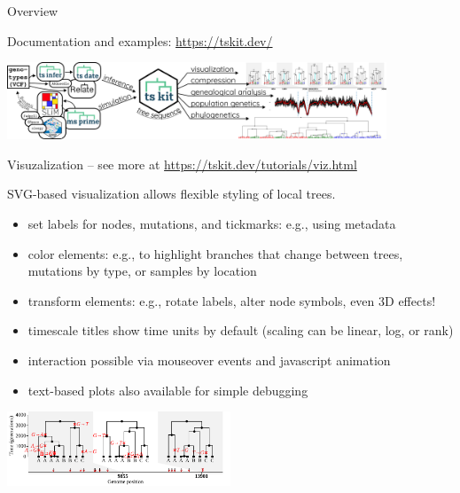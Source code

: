 \documentclass[landscape,a0paper,fontscale=0.4]{baposter}
\newcommand{\compresslist}{%
 \setlength{\itemsep}{1pt}%
 \setlength{\parskip}{0pt}%
 \setlength{\parsep}{0pt}%
 }
\begin{document}
\begin{poster}
\begin{posterbox}[name=overview,column=1,row=0,span=2]{Overview}
\begin{multicols}{2}
\end{multicols}

\begin{center} \Large
    Documentation and examples: \url{https://tskit.dev/}

    \vspace{2em}

    \includegraphics[width=0.85\textwidth]{workflow}
\end{center}


\end{posterbox}

\begin{posterbox}[name=viz,column=1,row=0,span=2,below=overview]{Visuzalization -- \textup{see more at \url{https://tskit.dev/tutorials/viz.html}}}


\begin{multicols}{2}

SVG-based visualization allows flexible styling of local trees.

\begin{itemize} \compresslist
    \item set labels for nodes, mutations, and tickmarks: e.g., using metadata
    \item color elements: e.g., to highlight branches that change between trees,
        mutations by type, or samples by location
    \item transform elements: e.g., rotate labels, alter node symbols, even 3D effects!
    \item timescale titles show time units by default (scaling can be linear, log, or rank)
    \item interaction possible via mouseover events and javascript animation
    \item text-based plots also available for simple debugging
\end{itemize}

\begin{center}
\includegraphics[width=0.5\textwidth]{viz_23_0}
\end{center}


\end{multicols}
\end{posterbox}
\end{poster}
\end{document}
